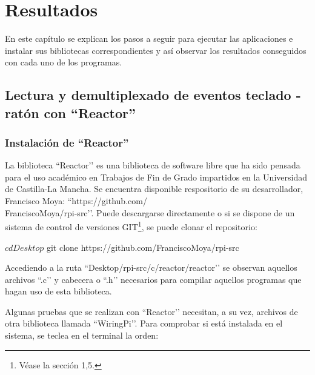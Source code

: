 \chapter{Resultados} \label{cap4}

En este capítulo se explican los pasos a seguir para ejecutar las aplicaciones e instalar sus bibliotecas correspondientes y así observar los resultados conseguidos con cada uno de los programas.

\newpage

\section{Lectura y demultiplexado de eventos teclado - ratón con ``Reactor''} \label{s4_1}

\subsection{Instalación de ``Reactor''} \label{s4_1_1}

La biblioteca ``Reactor’’ es una biblioteca de software libre que ha sido pensada para el uso académico en Trabajos de Fin de Grado impartidos en la Universidad de Castilla-La Mancha. Se encuentra disponible respositorio de su desarrollador, Francisco Moya: ``https://github.com/\\FranciscoMoya/rpi-src’’. Puede descargarse directamente o si se dispone de un sistema de control de versiones GIT\footnote{Véase la sección 1,5.}, se puede clonar el repositorio: \\

\begin{bashcode}
$ cd Desktop
$ git clone https://github.com/FranciscoMoya/rpi-src
\end{bashcode}

Accediendo a la ruta ``Desktop/rpi-src/c/reactor/reactor’’ se observan aquellos archivos ``.c’’ y cabecera o ``.h’’ necesarios para compilar aquellos programas que hagan uso de esta biblioteca.

Algunas pruebas que se realizan con ``Reactor’’ necesitan, a su vez, archivos de otra biblioteca llamada ``WiringPi’’. Para comprobar si está instalada en el sistema, se teclea en el terminal la orden:\\


